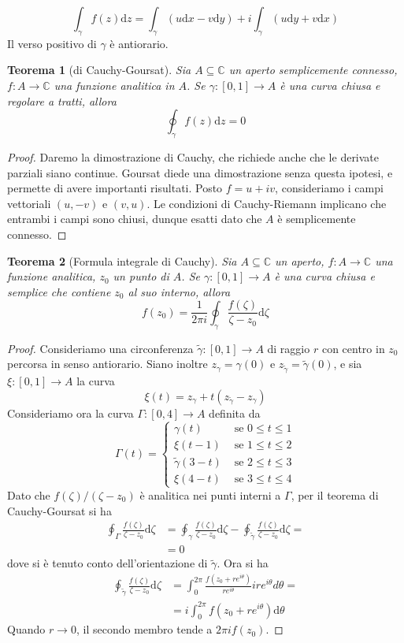 \documentclass[a4paper,11pt]{book}
\renewcommand{\d}{\mathrm{d}}
\newcommand{\C}{\mathbb{C}}
\theoremstyle{theorem}
\newtheorem{teorema}{Teorema}[section]
\theoremstyle{definition}
\begin{document}
\[\int_{\gamma}f(z)\d z=\int_{\gamma}(u\d x-v\d y)+i\int_{\gamma}(u\d y+v \d x)\]
Il verso positivo di $\gamma$ è antiorario.
\begin{teorema}[di Cauchy-Goursat]
	Sia $A\subseteq \C$ un aperto semplicemente connesso, $f\colon A\to\C$ una funzione analitica in $A$. Se $\gamma\colon[0,1]\to A$ è una curva chiusa e regolare a tratti, allora
	\[\oint_\gamma f(z)\d z=0\]
\end{teorema}
\begin{proof}
	Daremo la dimostrazione di Cauchy, che richiede anche che le derivate parziali siano continue. Goursat diede una dimostrazione senza questa ipotesi, e permette di avere importanti risultati. Posto $f=u+iv$, consideriamo i campi vettoriali $(u,-v)$ e $(v,u)$. Le condizioni di Cauchy-Riemann implicano che entrambi i campi sono chiusi, dunque esatti dato che $A$ è semplicemente connesso.
\end{proof}
\begin{teorema}[Formula integrale di Cauchy]
	Sia $A\subseteq\C$ un aperto, $f\colon A\to\C$ una funzione analitica, $z_0$ un punto di $A$. Se $\gamma\colon[0,1]\to A$ è una curva chiusa e semplice che contiene $z_0$ al suo interno, allora
	\[f(z_0)=\frac{1}{2\pi i}\oint_\gamma \frac{f(\zeta)}{\zeta-z_0}\d \zeta\]
\end{teorema}
\begin{proof}
	Consideriamo una circonferenza $\tilde{\gamma}\colon[0,1]\to A$ di raggio $r$ con centro in $z_0$ percorsa in senso antiorario. Siano inoltre $z_\gamma=\gamma(0)$ e $z_{\tilde{\gamma}}=\tilde\gamma(0)$, e sia $\xi\colon[0,1]\to A$ la curva
	\[\xi(t)=z_\gamma+t(z_{\tilde{\gamma}}-z_\gamma)\]
	Consideriamo ora la curva $\Gamma\colon[0,4]\to A$ definita da
	\[\Gamma(t)=\begin{cases}
		\gamma(t)&\textrm{ se }0\leq t\leq 1\\
		\xi(t-1)&\textrm{ se }1\leq t\leq 2\\
		\tilde{\gamma}(3-t)&\textrm{ se }2\leq t\leq 3\\
		\xi(4-t)&\textrm{ se }3\leq t\leq 4
	\end{cases}\]
	Dato che $f(\zeta)/(\zeta-z_0)$ è analitica nei punti interni a $\Gamma$, per il teorema di Cauchy-Goursat si ha
	\begin{align*}
		\oint_\Gamma \frac{f(\zeta)}{\zeta-z_0}\d \zeta&=\oint_\gamma \frac{f(\zeta)}{\zeta-z_0}\d \zeta-\oint_{\tilde{\gamma}}\frac{f(\zeta)}{\zeta-z_0}\d \zeta=\\&=0
	\end{align*}
	dove si è tenuto conto dell'orientazione di $\tilde{\gamma}$. Ora si ha
	\begin{align*}\oint_{\tilde{\gamma}}\frac{f(\zeta)}{\zeta-z_0}\d \zeta&=\int_{0}^{2\pi}\frac{f(z_0+re^{i\theta})}{re^{i\theta}}ire^{i\theta}d\theta=\\&=i\int_{0}^{2\pi}f(z_0+re^{i\theta})\d\theta\end{align*} 
	Quando $r\to0$, il secondo membro tende a $2\pi if(z_0)$.
\end{proof}
\end{document}
